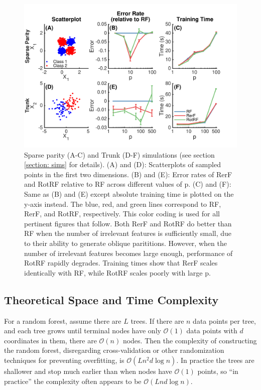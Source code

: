 \documentclass{article}
\providecommand{\mc}[1]{\mathcal{#1}}
\begin{document}
\begin{figure}[ht]
\vskip 0.2in
\begin{center}
\centerline{\includegraphics[width=\columnwidth]{../Figures/pdf/Fig2_simulations}}
\caption{Sparse parity (A-C) and Trunk (D-F) simulations (see section \ref{section: sims} for details). (A) and (D): Scatterplots of sampled points in the first two dimensions. (B) and (E): Error rates of RerF and RotRF relative to RF across different values of p. (C) and (F): Same as (B) and (E) except absolute training time is plotted on the y-axis instead. The blue, red, and green lines correspond to RF, RerF, and RotRF, respectively. This color coding is used for all pertinent figures that follow. Both RerF and RotRF do better than RF when the number of irrelevant features is sufficiently small, due to their ability to generate oblique parititions. However, when the number of irrelevant features becomes large enough, performance of RotRF rapidly degrades. Training times show that RerF scales identically with RF, while RotRF scales poorly with large p.}
\label{simulations}
\end{center}
\vskip -0.2in
\end{figure}

\subsection{Theoretical Space and Time Complexity}

For a random forest, assume there are $L$ trees.  
If there are $n$ data points per tree, and each tree grows until terminal nodes have only $\mc O(1)$ data points with $d$ coordinates in them, there are $\mc O(n)$ nodes.
Then the complexity of constructing the random forest, disregarding cross-validation or other randomization techniques for preventing overfitting, is $\mc O(Ln^2d\log n)$. In practice the trees are shallower and stop much earlier than when nodes have $\mc O(1)$ points, so ``in practice'' the complexity often appears to be $\mc O(Lnd\log n)$.
\end{document}
